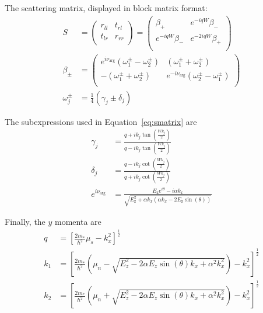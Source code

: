 			The scattering matrix, displayed in block matrix format:
			\begin{align}
			\label{eq:smatrix}
		    S &= \left(
		    \begin{array}{rr}
		    r_{ll}&t_{rl}\\
		    t_{lr}&r_{rr}\\
		    \end{array}
		    \right) =
		    \left(
		    \begin{array}{rr}
		    \beta_+ & e^{-i q W} \beta_-\\
		    e^{-i q W} \beta_- & e^{-2 i q W} \beta_+\\
		    \end{array}
		    \right)
		    \\
		    \beta_\pm &= \left(
		    \begin{array}{rr}
		    e^{i \nu_{\arg}}\left(\omega^\pm_1 - \omega^\pm_2\right) & (\omega^\pm _1 + \omega^\pm _2)\\
		    -(\omega^\pm _1 + \omega^\pm _2) & e^{-i \nu _{\arg }} \left(\omega^\pm _2 - \omega^\pm _1\right)\\
		    \end{array}
		    \right)\\
		    \omega^\pm_j &= \frac{1}{4} \left(\gamma _{j} \pm \delta _{j}\right)
			\end{align}

			The subexpressions used in Equation~\eqref{eq:smatrix} are
			\begin{align}
			    \gamma_j &= \frac{q+i k_{j} \tan \left(\frac{W k_{j}}{2}\right)}{q-i k_{j} \tan \left(\frac{W k_{j}}{2}\right)} \\
			    \delta_j &= \frac{q-i k_{j} \cot \left(\frac{W k_{j}}{2}\right)}{q+i k_{j} \cot \left(\frac{W k_{j}}{2}\right)}\\
			    e^{i \nu_{\arg}} &= \frac{E_\text{z} e^{i \theta }-i \alpha  k_x}{\sqrt{E_\text{z}^2+\alpha  k_x \left(\alpha  k_x-2 E_\text{z} \sin (\theta )\right)}}
			\end{align}

			Finally, the $y$ momenta are
			\begin{align}
			    q &= \left[ \frac{2 m_\ast}{\hbar ^2}\mu_s - k_x^2 \right]^\frac{1}{2}\\
			    k_1 &= \left[ \frac{2 m_\ast}{\hbar^2} \left(\mu_n-\sqrt{E_z^2-2 \alpha  E_z \sin (\theta ) k_x+\alpha ^2 k_x^2}\right) - k_x^2 \right]^\frac{1}{2}\\
			    k_2 &= \left[ \frac{2 m_\ast}{\hbar^2} \left(\mu_n+\sqrt{E_z^2-2 \alpha  E_z \sin (\theta ) k_x+\alpha ^2 k_x^2}\right) - k_x^2 \right]^\frac{1}{2}
			\label{eq:momenta_short_junction}
			\end{align}

